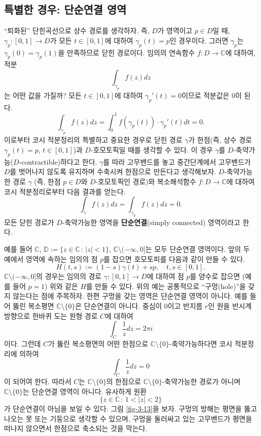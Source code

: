 \subsection{특별한 경우: 단순연결 영역}

``퇴화된'' 단힌곡선으로 상수 경로를 생각하자.
즉, $D$가 영역이고 $p\in D$일 때,
$\gamma_p:[0,1] \to D$가 모든 $t\in[0,1]$에 대하여 $\gamma_p(t)=p$인 경우이다.
그러면 $\gamma_p$는 $\gamma_p(0)=\gamma_p(1)$을 만족하므로 닫힌 경로이다.
임의의 연속함수 $f:D\to\mathbb C$에 대하여, 적분
\[
\int_{\gamma_p} f(z)dz
\]
는 어떤 값을 가질까? 
모든 $t\in[0,1]$에 대하여 $\gamma_p'(t)=0$이므로 적분값은
$0$이 된다.
\[
\int_{\gamma_p} f(z)dz = \int_0^1 f(\gamma_p(t))\cdot \gamma_p'(t)dt = 0.
\]
이로부터 코시 적분정리의 특별하고 중요한 경우로
닫힌 경로 $\gamma$가 한점(즉, 상수 경로 $\gamma_p(t)=p$, $t\in[0,1]$)과 
$D$-호모토픽일 때를 생각할 수 있다.
이 경우  $\gamma$를  $D$-축약가능($D$-contractible)하다고 한다.
$\gamma$를 따라 고무밴드를 놓고 
중간단계에서 고무밴드가 $D$를 벗어나지 않도록 유지하며 수축시켜 한점으로 
만든다고 생각해보자.
$D$-축약가능한 경로 $\gamma$ (즉, 한점 $p\in D$와 $D$-호모토픽인 경로)와
복소해석함수 $f:D \to \mathbb C$에 대하여
코시 적분정리로부터 다음 결과를 얻는다.
\[
\int_\gamma f(z) dz = \int_{\gamma_p} f(z) dz = 0.
\]
모든 닫힌 경로가 $D$-축약가능한 영역을 {\bf 단순연결}(simply connected) 영역이라고 한다.

예를 들어 $\mathbb C$, $\mathbb D:=\{z\in\mathbb C\,:\, |z|<1\}$,
$\mathbb C\setminus(-\infty,0]$는 모두 단순연결 영역이다.
앞의 두 예에서 영역에 속하는 임의의 점 $p$를 잡으면 호모토피를 다음과 같이 만들 수 있다.
\[
H(t,s) := (1-s)\gamma(t) + sp, \quad t,s\in[0,1].
\]
$\mathbb C\setminus(-\infty,0]$의 경우는
임의의 경로 $\gamma: [0,1] \to D$에 대하여
점 $p$를 양수로 잡으면 (예를 들어 $p=1$) 위와 같은 $H$를 만들 수 있다.
위의 예는 공통적으로 ``구멍(hole)''을 갖지 않는다는 점에 주목하자.
한편 구멍을 갖는 영역은 단순연결 영역이 아니다. 예를 들어
뚫린 복소평면 $\mathbb C\setminus \{0\}$은 단순연결이 아니다.
중심이 $0$이고 반지름 $r$인 원을 반시계방향으로 한바퀴 도는 원형 경로 $C$에 대하여
\[
\int_C \dfrac 1z dz = 2\pi i
\]
이다. 그런데 $C$가 뚫린 복소평면의 어떤 한점으로 
$\mathbb C\setminus \{0\}$-축약가능하다면
코시 적분정리에 의하여
\[
\int_C \dfrac 1z dz = 0
\]
이 되어여 한다.
따라서 $C$는 $\mathbb C\setminus \{0\}$의 한점으로 $\mathbb C\setminus \{0\}$-축약가능한 
경로가 아니며 $\mathbb C\setminus \{0\}$는 단순연결 영역이 아니다.
유사하게 원환
\[
\{ z\in\mathbb C \,:\,  1<|z|<2 \}
\]
가 단순연결이 아님을 보일 수 있다.
그림 \ref{fig-3-13}을 보자.
구멍의 방해는 평면을 뚫고 나오는 못 또는 기둥으로 생각할 수 있으며,
구멍을 둘러싸고 있는 고무밴드가 평면을 떠나지 않으면서
한점으로 축소되는 것을 막는다.

